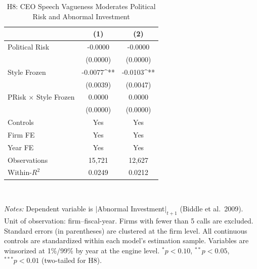 \begin{table}[htbp]
\centering
\caption{H8: CEO Speech Vagueness Moderates Political Risk and Abnormal Investment}
\label{tab:h8_political_risk}
\small
\begin{tabular}{lcc}
\toprule
 & (1) & (2) \\
\midrule
Political Risk & -0.0000 & -0.0000 \\
 & (0.0000) & (0.0000) \\
Style Frozen & -0.0077^{**} & -0.0103^{**} \\
 & (0.0039) & (0.0047) \\
PRisk $\times$ Style Frozen & 0.0000 & 0.0000 \\
 & (0.0000) & (0.0000) \\
\midrule
Controls & Yes & Yes \\
Firm FE  & Yes & Yes \\
Year FE  & Yes & Yes \\
\midrule
Observations & 15,721 & 12,627 \\
Within-$R^2$ & 0.0249 & 0.0212 \\
\bottomrule
\end{tabular}
\\[-0.5em]
\parbox{\textwidth}{\scriptsize 
\textit{Notes:} Dependent variable is $|$Abnormal Investment$|_{t+1}$ (Biddle et al.\ 2009). Unit of observation: firm--fiscal-year. Firms with fewer than 5 calls are excluded. Standard errors (in parentheses) are clustered at the firm level. All continuous controls are standardized within each model's estimation sample. Variables are winsorized at 1\%/99\% by year at the engine level. $^{*}p<0.10$, $^{**}p<0.05$, $^{***}p<0.01$ (two-tailed for H8).
}
\end{table}